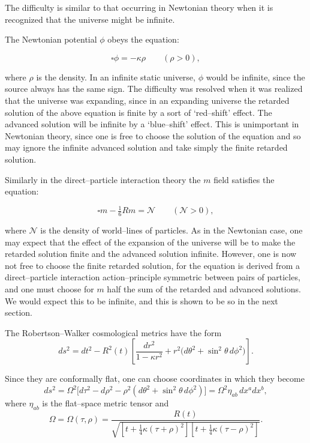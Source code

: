 \medskip

The difficulty is similar to that occurring in Newtonian theory 
when it is recognized that the universe might be infinite.  

The Newtonian potential \(\phi\) obeys the equation:

\[
\square \phi = - \kappa \rho \qquad (\rho > 0),
\]

where \(\rho\) is the density.
In an infinite static universe, \(\phi\) would be infinite, since 
the source always has the same sign. The difficulty was resolved 
when it was realized that the universe was expanding, since 
in an expanding universe the retarded solution of the above 
equation is finite by a sort of `red--shift' effect. The 
advanced solution will be infinite by a `blue--shift' effect. 
This is unimportant in Newtonian theory, since one is free 
to choose the solution of the equation and so may ignore the 
infinite advanced solution and take simply the finite 
retarded solution.

\medskip

Similarly in the direct--particle interaction theory the 
\(m\) field satisfies the equation:

\[
\square m - \tfrac{1}{6} R m = \mathcal{N} \qquad (\mathcal{N} > 0),
\]

where \(\mathcal{N}\) is the density of world--lines of particles. 
As in the Newtonian case, one may expect that the effect of the 
expansion of the universe will be to make the retarded solution 
finite and the advanced solution infinite. However, one is 
now not free to choose the finite retarded solution, for the 
equation is derived from a direct--particle interaction action--principle 
symmetric between pairs of particles, and one must choose for \(m\) 
half the sum of the retarded and advanced solutions. We would expect 
this to be infinite, and this is shown to be so in the next section.

The Robertson--Walker cosmological metrics have the form
\[
ds^{2} = dt^{2} - R^{2}(t) \left[ \frac{dr^{2}}{1 - \kappa r^{2}} 
+ r^{2}\bigl(d\theta^{2} + \sin^{2}\theta \, d\phi^{2}\bigr) \right].
\]

Since they are conformally flat, one can choose coordinates in which they become
\[
ds^{2} = \Omega^{2} \bigl[ d\tau^{2} - d\rho^{2} - \rho^{2}(d\theta^{2} + \sin^{2}\theta \, d\phi^{2}) \bigr]
= \Omega^{2} \eta_{ab}\, dx^{a} dx^{b},
\]
where \(\eta_{ab}\) is the flat--space metric tensor and
\[
\Omega = \Omega(\tau,\rho) = \frac{R(t)}{\sqrt{[t + \tfrac{1}{4}\kappa(\tau+\rho)^{2}][t + \tfrac{1}{4}\kappa(\tau-\rho)^{2}]}}. \tag{7}
\]

